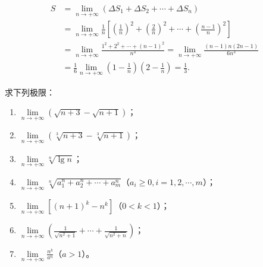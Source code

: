 \begin{solution}
\begin{align*}
S &= \lim_{n\to+\infty}\left(\Delta S_{1}+\Delta S_{2}+\cdots+\Delta S_{n}\right) \\
&= \lim_{n\to+\infty}\frac{1}{n}\left[\left(\frac{1}{n}\right)^{2}+\left(\frac{2}{n}\right)^{2}+\cdots+\left(\frac{n-1}{n}\right)^{2}\right] \\
&= \lim_{n\to+\infty}\frac{1^{2}+2^{2}+\cdots+(n-1)^{2}}{n^{3}} = \lim_{n\to+\infty}\frac{(n-1)n(2n-1)}{6n^{3}} \\
&= \frac{1}{6}\lim_{n\to+\infty}\left(1-\frac{1}{n}\right)\left(2-\frac{1}{n}\right) = \frac{1}{3}.
\end{align*}
\end{solution}

\begin{example}\label{ex:1.2.5}
求下列极限：
\begin{enumerate}
  \item $\lim\limits_{n \to +\infty} (\sqrt{n+3} - \sqrt{n+1})$；
  \item $\lim\limits_{n \to +\infty} (\sqrt[3]{n+3} - \sqrt[3]{n+1})$；
  \item $\lim\limits_{n \to +\infty}\sqrt[n]{\lg n}$；
  \item $\lim\limits_{n\to+\infty}\sqrt[n]{a_1^n+a_2^n+\cdots+a_m^n}$（$a_i\geqslant0, i=1,2,\cdots,m$）；
  \item $\lim\limits_{n \to +\infty} [(n+1)^k - n^k]$（$0 < k < 1$）；
  \item $\lim\limits_{n \to +\infty} \left( \frac{1}{\sqrt{n^2 + 1}} + \cdots + \frac{1}{\sqrt{n^2 + n}} \right)$；
  \item $\lim\limits_{n \to +\infty} \frac{n^k}{a^n}$（$a > 1$）。
\end{enumerate}
\end{example}


